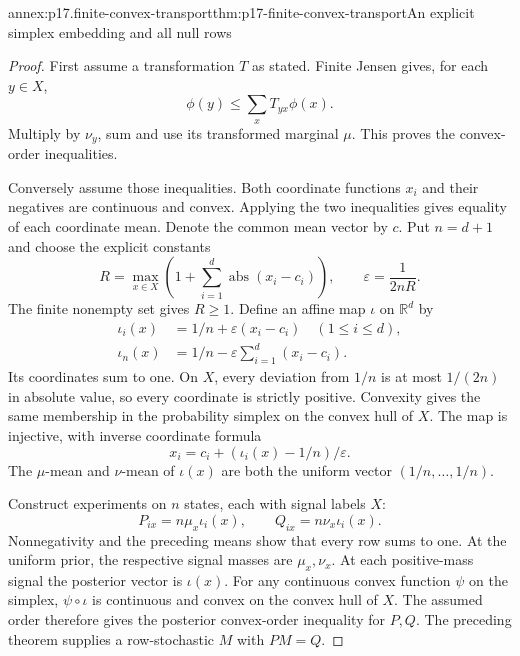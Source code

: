 \begin{annexitem}{annex:p17.finite-convex-transport}{thm:p17-finite-convex-transport}{An explicit simplex embedding and all null rows}
\begin{proof}
First assume a transformation \(T\) as stated. Finite Jensen gives,
for each \(y\in X\),
\[
                         \phi(y)\leq\sum_xT_{yx}\phi(x).
\]
Multiply by \(\nu_y\), sum and use its transformed marginal \(\mu\).
This proves the convex-order inequalities.

Conversely assume those inequalities. Both coordinate functions \(x_i\)
and their negatives are continuous and convex. Applying the two
inequalities gives equality of each coordinate mean. Denote the common
mean vector by \(c\).
Put \(n=d+1\) and choose the explicit constants
\[
 R=\max_{x\in X}\left(1+\sum_{i=1}^d
                       \operatorname{abs}(x_i-c_i)\right),\qquad
 \varepsilon=\frac{1}{2nR}.
\]
The finite nonempty set gives \(R\geq1\).
Define an affine map \(\iota\) on \(\mathbb R^d\) by
\[
 \begin{aligned}
 \iota_i(x)&=1/n+\varepsilon(x_i-c_i)\quad(1\leq i\leq d),\\
 \iota_n(x)&=1/n-\varepsilon\sum_{i=1}^d(x_i-c_i).
 \end{aligned}
\]
Its coordinates sum to one. On \(X\), every deviation from \(1/n\)
is at most \(1/(2n)\) in absolute value, so every coordinate is
strictly positive. Convexity gives the same membership in the
probability simplex on the convex hull of \(X\).
The map is injective, with inverse coordinate formula
\[
                      x_i=c_i+(\iota_i(x)-1/n)/\varepsilon.
\]
The \(\mu\)-mean and \(\nu\)-mean of \(\iota(x)\) are both the
uniform vector \((1/n,\ldots,1/n)\).

Construct experiments on \(n\) states, each with signal labels \(X\):
\[
                       P_{ix}=n\mu_x\iota_i(x),\qquad
                       Q_{ix}=n\nu_x\iota_i(x).
\]
Nonnegativity and the preceding means show that every row sums to one.
At the uniform prior, the respective signal masses are \(\mu_x,\nu_x\).
At each positive-mass signal the posterior vector is \(\iota(x)\).
For any continuous convex function \(\psi\) on the simplex,
\(\psi\circ\iota\) is continuous and convex on the convex hull of \(X\).
The assumed order therefore gives the posterior convex-order inequality
for \(P,Q\). The preceding theorem supplies a row-stochastic \(M\)
with \(PM=Q\).


\end{proof}
\end{annexitem}
